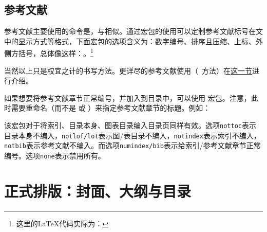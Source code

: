 \subsection{参考文献}
\label{subsec:cite}
参考文献主要使用的命令是，与相似。通过宏包的使用可以定制参考文献标号在文中的显示方式等格式，下面宏包的选项含义为：数字编号、排序且压缩、上标、外侧方括号，总体像这样：\textsuperscript{\ttfamily [1,3-5]}。\footnote{这里的LaTeX代码实际为：}

当然以上只是权宜之计的书写方法。更详尽的参考文献使用（\bibtex\ 方法）在\hyperref[sec:bibtex]{\bibtex{}这一节}进行介绍。

如果想要将参考文献章节正常编号，并加入到目录中，可以使用  宏包\label{pkg:tocbibind}。注意，此时需要重命名（而不是  或 ）来指定参考文献章节的标题。例如：
\begin{latex}
\usepackage[nottoc,numbib]{tocbibind}
\renewcommand{\tocbibname}{References}
\end{latex}

该宏包对于将索引、目录本身、图表目录编入目录页同样有效。选项\texttt{nottoc}表示目录本身不编入，\texttt{notlof/lot}表示图/表目录不编入，\texttt{notindex}表示索引不编入，\texttt{notbib}表示参考文献不编入。而选项\texttt{numindex/bib}表示给索引/参考文献章节正常编号。选项\texttt{none}表示禁用所有。

\section{正式排版：封面、大纲与目录}

